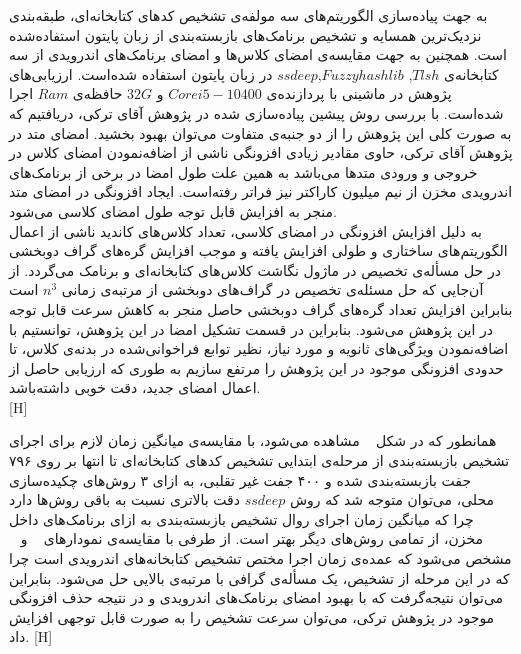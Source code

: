 به جهت پیاده‌سازی الگوریتم‌های سه مولفه‌ی تشخیص کد‌های کتابخانه‌ای، طبقه‌بندی نزدیک‌ترین همسایه و تشخیص برنامک‌های بازبسته‌بندی از زبان پایتون استفاده‌شده است. همچنین به جهت مقایسه‌ی امضای کلاس‌ها و امضای برنامک‌های اندرویدی از سه کتابخانه‌ی  $Tlsh$, $Fuzzyhashlib$,$ssdeep$ در زبان پایتون استفاده شده‌است. ارزیابی‌های پژوهش در ماشینی با پردازنده‌ی $Core i5- 10400$ و $32G$ حافظه‌ی $Ram$ اجرا شده‌است.  
\label{pairwisepure}
با بررسی روش پیشین پیاده‌سازی شده در پژوهش آقای ترکی، دریافتیم که به صورت کلی این پژوهش را از دو جنبه‌ی متفاوت می‌توان بهبود بخشید. امضای‌ متد در پژوهش آقای ترکی، حاوی مقادیر زیادی افزونگی ناشی از اضافه‌نمودن امضای کلاس در خروجی و ورودی متد‌ها می‌باشد به همین علت طول امضا در برخی از برنامک‌های اندرویدی مخزن از نیم میلیون کاراکتر نیز فراتر رفته‌است. ایجاد افزونگی در امضای متد منجر به افزایش قابل توجه طول امضای کلاسی می‌شود. \\
به دلیل افزایش افزونگی در امضای کلاسی، تعداد کلاس‌های کاندید ناشی از اعمال الگوریتم‌های ساختاری و طولی افزایش یافته و موجب افزایش گره‌های گراف دوبخشی در حل مسأله‌ی تخصیص در ماژول نگاشت کلاس‌های کتابخانه‌ای و برنامک می‌گردد.  از آن‌جایی که حل مسئله‌ی تخصیص در گراف‌های دوبخشی از مرتبه‌ی زمانی $n^3$
است بنابراین افزایش تعداد گره‌های گراف دوبخشی حاصل منجر به کاهش سرعت قابل توجه در این پژوهش می‌شود. بنابراین در قسمت تشکیل امضا در این پژوهش، توانستیم با اضافه‌نمودن ویژگی‌های ثانویه و مورد نیاز،‌ نظیر توابع فراخوانی‌شده در بدنه‌ی کلاس، تا حدودی افزونگی موجود در این پژوهش را مرتفع سازیم به طوری که ارزیابی حاصل از اعمال امضا‌ی جدید، دقت خوبی داشته‌باشد. \\
 [H]
\vspace{1em}


 همانطور که در شکل ~ مشاهده می‌شود، با مقایسه‌ی میانگین زمان لازم برای اجرای تشخیص بازبسته‌بندی از مرحله‌ی ابتدایی تشخیص کد‌های کتابخانه‌ای تا انتها بر روی ۷۹۶ جفت بازبسته‌بندی شده و ۴۰۰ جفت غیر تقلبی، به ازای ۳ روش‌های چکیده‌سازی محلی، می‌توان متوجه شد که روش $ssdeep$ دقت بالاتری نسبت به باقی روش‌ها دارد چرا که میانگین زمان اجرای روال تشخیص بازبسته‌بندی به ازای برنامک‌های داخل مخزن، از تمامی روش‌های دیگر بهتر است. از طرفی با مقایسه‌ی نمودار‌های ~ و ~ مشخص می‌شود که عمده‌ی زمان اجرا مختص تشخیص کتابخانه‌های اندرویدی است چرا که در این مرحله از تشخیص، یک مسأله‌ی گرافی با مرتبه‌ی بالایی حل می‌شود. بنابراین می‌توان نتیجه‌گرفت که با بهبود امضای برنامک‌های اندرویدی و در نتیجه حذف افزونگی موجود در پژوهش ترکی، می‌توان سرعت تشخیص را به صورت قابل توجهی افزایش داد.
  [H]
 \vspace{1em}
 
